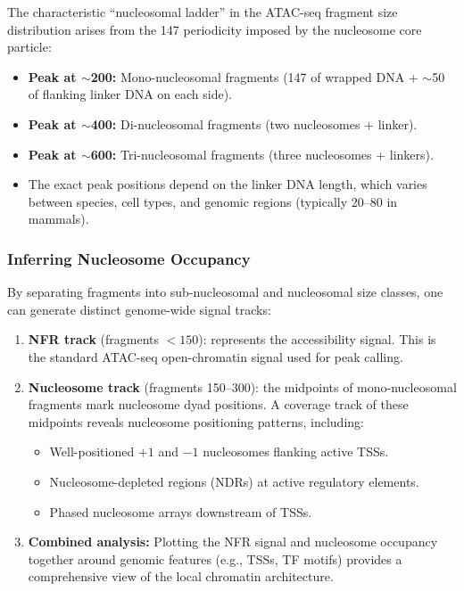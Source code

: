 The characteristic ``nucleosomal ladder'' in the ATAC-seq fragment size distribution arises from the 147\basepair{} periodicity imposed by the nucleosome core particle:
\begin{itemize}[itemsep=2pt]
  \item \textbf{Peak at $\sim$200\basepair{}:} Mono-nucleosomal fragments (147\basepair{} of wrapped DNA + $\sim$50\basepair{} of flanking linker DNA on each side).
  \item \textbf{Peak at $\sim$400\basepair{}:} Di-nucleosomal fragments (two nucleosomes + linker).
  \item \textbf{Peak at $\sim$600\basepair{}:} Tri-nucleosomal fragments (three nucleosomes + linkers).
  \item The exact peak positions depend on the linker DNA length, which varies between species, cell types, and genomic regions (typically 20--80\basepair{} in mammals).
\end{itemize}

\subsubsection{Inferring Nucleosome Occupancy}

By separating fragments into sub-nucleosomal and nucleosomal size classes, one can generate distinct genome-wide signal tracks:

\begin{enumerate}[itemsep=2pt]
  \item \textbf{NFR track} (fragments $< 150$\basepair{}): represents the accessibility signal. This is the standard ATAC-seq open-chromatin signal used for peak calling.
  \item \textbf{Nucleosome track} (fragments 150--300\basepair{}): the midpoints of mono-nucleosomal fragments mark nucleosome dyad positions. A coverage track of these midpoints reveals nucleosome positioning patterns, including:
  \begin{itemize}[itemsep=1pt]
    \item Well-positioned $+1$ and $-1$ nucleosomes flanking active TSSs.
    \item Nucleosome-depleted regions (NDRs) at active regulatory elements.
    \item Phased nucleosome arrays downstream of TSSs.
  \end{itemize}
  \item \textbf{Combined analysis:} Plotting the NFR signal and nucleosome occupancy together around genomic features (e.g., TSSs, TF motifs) provides a comprehensive view of the local chromatin architecture.
\end{enumerate}

